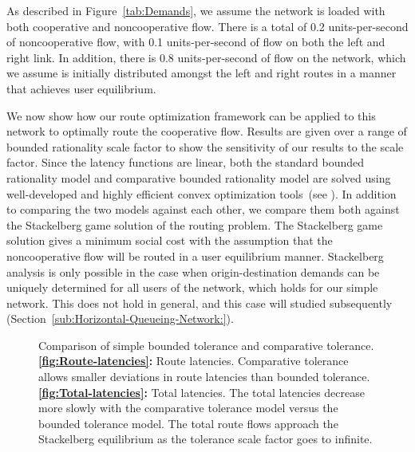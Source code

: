 As described in Figure~\ref{tab:Demands}, we assume the network
is loaded with both cooperative and noncooperative flow. There is
a total of 0.2 units-per-second of noncooperative flow, with 0.1 units-per-second
of flow on both the left and right link. In addition, there is 0.8
units-per-second of flow on the network, which we assume is initially
distributed amongst the left and right routes in a manner that achieves
user equilibrium.

We now show how our route optimization framework can be applied to
this network to optimally route the cooperative flow. Results are
given over a range of bounded rationality scale factor to show the
sensitivity of our results to the scale factor. Since the latency
functions are linear, both the standard bounded rationality model
and comparative bounded rationality model are solved using well-developed
and highly efficient convex optimization tools~(see \cite{cvxpy}).
In addition to comparing the two models against each other, we compare
them both against the Stackelberg game solution of the routing problem.
The Stackelberg game solution gives a minimum social cost with the
assumption that the noncooperative flow will be routed in a user equilibrium
manner. Stackelberg analysis is only possible in the case when origin-destination
demands can be uniquely determined for all users of the network, which
holds for our simple network. This does not hold in general, and this
case will studied subsequently (Section~\ref{sub:Horizontal-Queueing-Network:}).
\begin{figure}
\centering%
\hfill%
%
\caption[Comparison of simple bounded tolerance and comparative tolerance.]{Comparison of simple bounded tolerance
and comparative tolerance. \textbf{\ref{fig:Route-latencies}:} Route
latencies. Comparative tolerance allows smaller deviations in route
latencies than bounded tolerance. \textbf{\ref{fig:Total-latencies}:}
Total latencies. The total latencies decrease more slowly with the
comparative tolerance model versus the bounded tolerance model. The
total route flows approach the Stackelberg equilibrium as the tolerance
scale factor goes to infinite.}%
\label{fig:Comparison-of-simple}
\end{figure}


